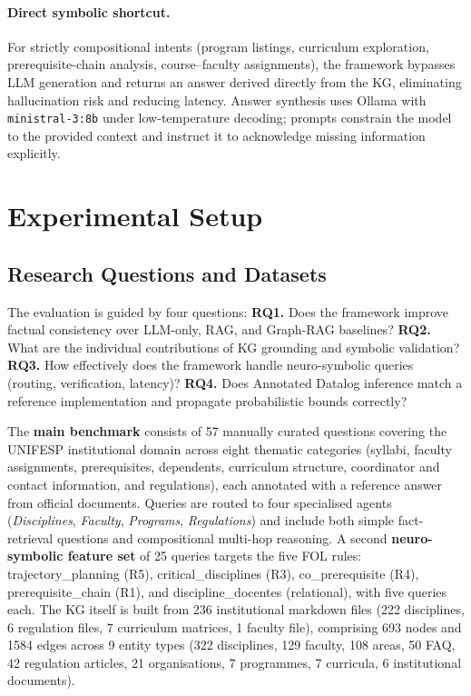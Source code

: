 \documentclass[runningheads]{llncs}
\begin{document}
\paragraph{Direct symbolic shortcut.} For strictly compositional intents (program listings, curriculum exploration, prerequisite-chain analysis, course–faculty assignments), the framework bypasses LLM generation and returns an answer derived directly from the KG, eliminating hallucination risk and reducing latency. Answer synthesis uses Ollama with \texttt{ministral-3:8b} under low-temperature decoding; prompts constrain the model to the provided context and instruct it to acknowledge missing information explicitly.


\section{Experimental Setup}

\subsection{Research Questions and Datasets}

The evaluation is guided by four questions: \textbf{RQ1.} Does the framework improve factual consistency over LLM-only, RAG, and Graph-RAG baselines? \textbf{RQ2.} What are the individual contributions of KG grounding and symbolic validation? \textbf{RQ3.} How effectively does the framework handle neuro-symbolic queries (routing, verification, latency)? \textbf{RQ4.} Does Annotated Datalog inference match a reference implementation and propagate probabilistic bounds correctly?

The \textbf{main benchmark} consists of 57 manually curated questions covering the UNIFESP institutional domain across eight thematic categories (syllabi, faculty assignments, prerequisites, dependents, curriculum structure, coordinator and contact information, and regulations), each annotated with a reference answer from official documents. Queries are routed to four specialised agents (\textit{Disciplines}, \textit{Faculty}, \textit{Programs}, \textit{Regulations}) and include both simple fact-retrieval questions and compositional multi-hop reasoning. A second \textbf{neuro-symbolic feature set} of 25 queries targets the five FOL rules: trajectory\_planning (R5), critical\_disciplines (R3), co\_prerequisite (R4), prerequisite\_chain (R1), and discipline\_docentes (relational), with five queries each. The KG itself is built from 236 institutional markdown files (222 disciplines, 6 regulation files, 7 curriculum matrices, 1 faculty file), comprising 693 nodes and 1584 edges across 9 entity types (322 disciplines, 129 faculty, 108 areas, 50 FAQ, 42 regulation articles, 21 organisations, 7 programmes, 7 curricula, 6 institutional documents).
\end{document}
